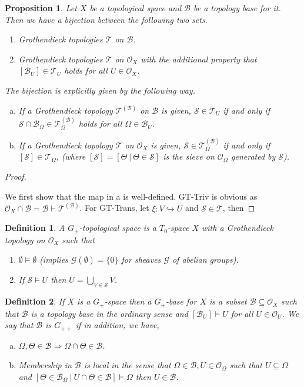 \documentclass[8pt]{article}
\numberwithin{equation}{section}
\newtheorem{proposition}{Proposition}[subsection]
\newtheorem{definition}{Definition}[subsection]
\newcommand{\Ouv}{\mathscr{O}}
\newcommand{\sep}[0]{\:|\:}
\newcommand{\sS}[0]{\mathscr{S}}
\newcommand{\cB}[0]{\mathcal{B}}
\newcommand{\cT}[0]{\mathcal{T}}
\begin{document}
\begin{proposition}
    \label{proposition_9_1}
    Let $X$ be a topological space and $\cB$ be a topology base for it. Then we have a bijection between the following two sets.
    \begin{enumerate}[1.]
        \item Grothendieck topologies $\mathcal{T}$ on $\cB$.
        \item Grothendieck topologies $\mathcal{T}$ on $\Ouv_X$ with the additional property that $[\cB_U]\in\mathcal{T}_U$ holds for all $U\in\Ouv_X$.
    \end{enumerate}
    The bijection is explicitly given by the following way.
    \begin{enumerate}[a.]
        \item If a Grothendieck topology $\mathcal{T}^{(\cB)}$ on $\cB$ is given, $\sS\in\mathcal{T}_U$ if and only if $\sS\cap\cB_\Omega\in\mathcal{T}_\Omega^{(\cB)}$ holds for all $\Omega\in\cB_U$.
        \item If a Grothendieck topology $\mathcal{T}$ on $\Ouv_X$ is given, $\sS\in\mathcal{T}_\Omega^{(\cB)}$ if and only if $[\sS]\in\mathcal{T}_\Omega$, (where $[\sS]=[\Theta\sep \Theta\in\sS]$ is the sieve on $\Ouv_\Omega$ generated by $\sS$).
    \end{enumerate}
\end{proposition}
\begin{proof}$\:$
    \par We first show that the map in a is well-defined. GT-Triv is obvious as $\Ouv_X\cap\mathcal{B} = \mathcal{B}\vdash\mathcal{T}^{(\mathcal{B})}$. For GT-Trans, let $\xi:V\hookrightarrow U$ and $\sS\in\cT$, then 
\end{proof}
\begin{definition}
    \label{definition_9_4}
    A $G_+$-topological space is a $T_0$-space $X$ with a Grothendieck topology on $\Ouv_X$ such that
    \begin{enumerate}
        \item $\emptyset\vDash \emptyset$ (implies $\mathcal{G}(\emptyset)=\{0\}$ for sheaves $\mathcal{G}$ of abelian groups).
        \item If $\sS\vDash U$ then $U = \bigcup_{V\in\sS}V$.
    \end{enumerate}
\end{definition}
\begin{definition}
    \label{definition_9_5}
    If $X$ is a $G_+$-space then a $G_+$-base for $X$ is a subset $\cB\subseteq\Ouv_X$ such that $\cB$ is a topology base in the ordinary sense and $[\cB_U]\vDash U$ for all $U\in\Ouv_U$. We say that $\cB$ is $G_{++}$ if in addition, we have,
    \begin{enumerate}[a.]
        \item $\Omega,\Theta\in\cB \Rightarrow \Omega\cap \Theta \in\cB$.
        \item Membership in $\cB$ is local in the sense that $\Omega\in\cB,U\in\Ouv_\Omega$ such that $U\subseteq \Omega$ and $[\Theta\in\cB_\Omega\sep U\cap \Theta\in\cB]\vDash \Omega$ then $U\in\cB$.
    \end{enumerate}
\end{definition}
\end{document}
